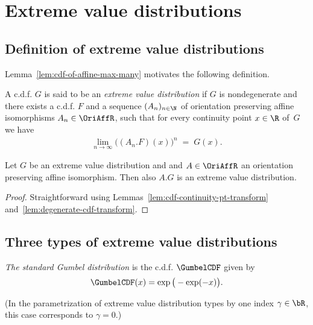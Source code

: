 \chapter{Extreme value distributions}

\section{Definition of extreme value distributions}

Lemma~\ref{lem:cdf-of-affine-max-many} motivates the following definition.

\begin{definition}
  \label{def:extr-val-distr}
  \leanok
  A c.d.f. $G$ is said to be an \emph{extreme value distribution} if
  $G$ is nondegenerate and
  there exists a c.d.f. $F$ and a sequence $(A_n)_{n \in \N}$ of orientation
  preserving affine isomorphisms $A_n \in \OriAffR$, such that
  for every continuity point $x \in \R$ of~$G$ we have
  \begin{align*}
  \lim_{n \to \infty} \big( (A_n.F)(x) \big)^n \; = \; G(x) .
  \end{align*}
\end{definition}

\begin{lemma}
  \label{lem:extr-val-distr-transform}
  \leanok
  Let $G$ be an extreme value distribution and
  and $A \in \OriAffR$ an orientation preserving affine isomorphism.
  Then also $A.G$ is an extreme value distribution.
\end{lemma}
\begin{proof}
  \leanok
  Straightforward using Lemmas~\ref{lem:cdf-continuity-pt-transform}
  and~\ref{lem:degenerate-cdf-transform}.
\end{proof}



\section{Three types of extreme value distributions}

\begin{definition}
  \label{def:std-Gumbel-cdf}
  \emph{The standard Gumbel distribution} is the c.d.f. $\GumbelCDF$ given by
  \begin{align*}
  \GumbelCDF (x) = \exp\big(-\exp(-x)\big) .
  \end{align*}

  (In the parametrization of extreme value distribution types by one
  index $\gamma \in \bR$, this case corresponds to $\gamma = 0$.)
\end{definition}

